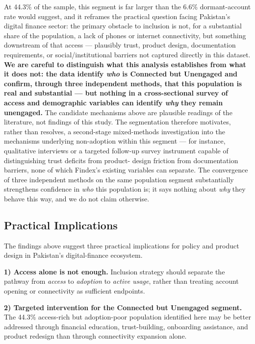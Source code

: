 \documentclass[conference]{IEEEtran}
\begin{document}
At 44.3\% of the sample, this segment is far larger than the 6.6\%
dormant-account rate would suggest, and it reframes the practical question
facing Pakistan's digital finance sector: the primary obstacle to
inclusion is not, for a substantial share of the population, a lack of
phones or internet connectivity, but something downstream of that access
--- plausibly trust, product design, documentation requirements, or
social/institutional barriers not captured directly in this dataset.
\textbf{We are careful to distinguish what this analysis establishes from
what it does not: the data identify \emph{who} is Connected but Unengaged
and confirm, through three independent methods, that this population is
real and substantial --- but nothing in a cross-sectional survey of
access and demographic variables can identify \emph{why} they remain
unengaged.} The candidate mechanisms above are plausible readings of the
literature, not findings of this study. The segmentation therefore
motivates, rather than resolves, a second-stage mixed-methods
investigation into the mechanisms underlying non-adoption within this
segment --- for instance, qualitative interviews or a targeted follow-up
survey instrument capable of distinguishing trust deficits from product-
design friction from documentation barriers, none of which Findex's
existing variables can separate. The convergence of three independent
methods on the same population segment substantially strengthens
confidence in \emph{who} this population is; it says nothing about
\emph{why} they behave this way, and we do not claim otherwise.

\subsection{Practical Implications}
\label{subsec:practical_implications}

The findings above suggest three practical implications for policy and
product design in Pakistan's digital-finance ecosystem.

\textbf{1) Access alone is not enough.} Inclusion strategy should
separate the pathway from \emph{access} to \emph{adoption} to
\emph{active usage}, rather than treating account opening or connectivity
as sufficient endpoints.

\textbf{2) Targeted intervention for the Connected but Unengaged
segment.} The 44.3\% access-rich but adoption-poor population identified
here may be better addressed through financial education, trust-building,
onboarding assistance, and product redesign than through connectivity
expansion alone.
\end{document}
